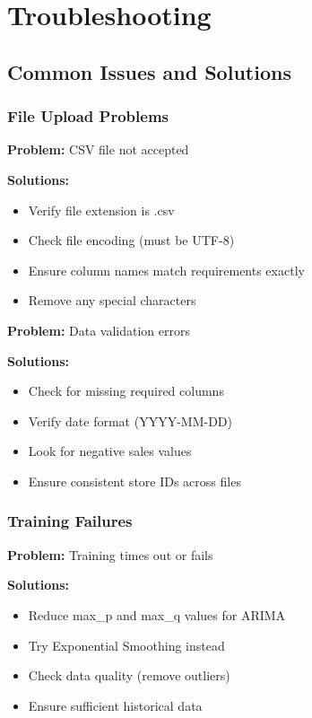 \chapter{Troubleshooting}

\section{Common Issues and Solutions}

\subsection{File Upload Problems}

\textbf{Problem:} CSV file not accepted

\textbf{Solutions:}
\begin{itemize}
	\item Verify file extension is .csv
	\item Check file encoding (must be UTF-8)
	\item Ensure column names match requirements exactly
	\item Remove any special characters
\end{itemize}

\textbf{Problem:} Data validation errors

\textbf{Solutions:}
\begin{itemize}
	\item Check for missing required columns
	\item Verify date format (YYYY-MM-DD)
	\item Look for negative sales values
	\item Ensure consistent store IDs across files
\end{itemize}

\subsection{Training Failures}

\textbf{Problem:} Training times out or fails

\textbf{Solutions:}
\begin{itemize}
	\item Reduce max\_p and max\_q values for ARIMA
	\item Try Exponential Smoothing instead
	\item Check data quality (remove outliers)
	\item Ensure sufficient historical data
\end{itemize}

